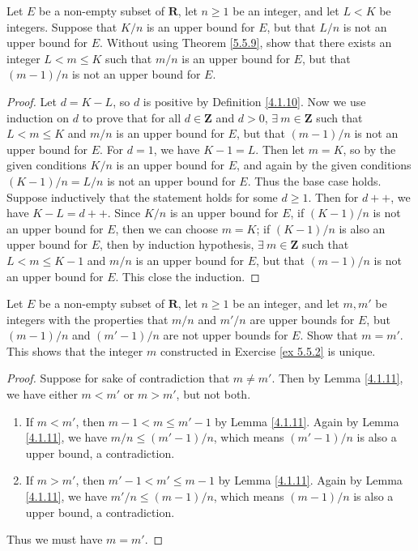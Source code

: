 \begin{exercise}\label{ex 5.5.2}
Let \(E\) be a non-empty subset of \(\mathbf{R}\), let \(n \geq 1\) be an integer, and let \(L < K\) be integers.
Suppose that \(K / n\) is an upper bound for \(E\), but that \(L / n\) is not an upper bound for \(E\).
Without using Theorem \ref{5.5.9}, show that there exists an integer \(L < m \leq K\) such that \(m / n\) is an upper bound for \(E\), but that \((m - 1) / n\) is not an upper bound for \(E\).
\end{exercise}

\begin{proof}
Let \(d = K - L\), so \(d\) is positive by Definition \ref{4.1.10}.
Now we use induction on \(d\) to prove that for all \(d \in \mathbf{Z}\) and \(d > 0\), \(\exists\ m \in \mathbf{Z}\) such that \(L < m \leq K\) and \(m / n\) is an upper bound for \(E\), but that \((m - 1) / n\) is not an upper bound for \(E\).
For \(d = 1\), we have \(K - 1 = L\).
Then let \(m = K\), so by the given conditions \(K / n\) is an upper bound for \(E\), and again by the given conditions \((K - 1) / n = L / n\) is not an upper bound for \(E\).
Thus the base case holds.
Suppose inductively that the statement holds for some \(d \geq 1\).
Then for \(d++\), we have \(K - L = d++\).
Since \(K / n\) is an upper bound for \(E\), if \((K - 1) / n\) is not an upper bound for \(E\), then we can choose \(m = K\);
if \((K - 1) / n\) is also an upper bound for \(E\), then by induction hypothesis, \(\exists\ m \in \mathbf{Z}\) such that \(L < m \leq K - 1\) and \(m / n\) is an upper bound for \(E\), but that \((m - 1) / n\) is not an upper bound for \(E\).
This close the induction.
\end{proof}

\begin{exercise}\label{ex 5.5.3}
Let \(E\) be a non-empty subset of \(\mathbf{R}\), let \(n \geq 1\) be an integer, and let \(m, m'\) be integers with the properties that \(m / n\) and \(m' / n\) are upper bounds for \(E\), but \((m - 1) / n\) and \((m' - 1) / n\) are not upper bounds for \(E\).
Show that \(m = m'\).
This shows that the integer \(m\) constructed in Exercise \ref{ex 5.5.2} is unique.
\end{exercise}

\begin{proof}
Suppose for sake of contradiction that \(m \neq m'\).
Then by Lemma \ref{4.1.11}, we have either \(m < m'\) or \(m > m'\), but not both.
\begin{enumerate}
    \item If \(m < m'\), then \(m - 1 < m \leq m' - 1\) by Lemma \ref{4.1.11}.
    Again by Lemma \ref{4.1.11}, we have \(m / n \leq (m' - 1) / n\), which means \((m' - 1) / n\) is also a upper bound, a contradiction.
    \item If \(m > m'\), then \(m' - 1 < m' \leq m - 1\) by Lemma \ref{4.1.11}.
    Again by Lemma \ref{4.1.11}, we have \(m' / n \leq (m - 1) / n\), which means \((m - 1) / n\) is also a upper bound, a contradiction.
\end{enumerate}
Thus we must have \(m = m'\).
\end{proof}

